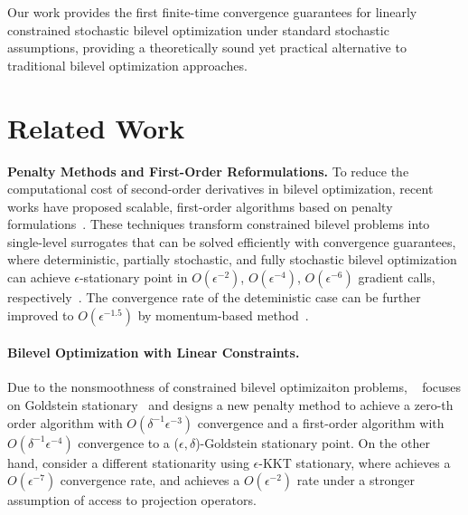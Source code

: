 \documentclass[letterpaper]{article} %
\newcommand{\1}{\mathbf{1}}
\begin{document}
Our work provides the first finite-time convergence guarantees for linearly constrained stochastic bilevel optimization under standard stochastic assumptions, providing a theoretically sound yet practical alternative to traditional bilevel optimization approaches.

\section{Related Work}

\textbf{Penalty Methods and First-Order Reformulations.} To reduce the computational cost of second-order derivatives in bilevel optimization, recent works have proposed scalable, first-order algorithms based on penalty formulations~\cite{kwon2023,liu2022bome}. These techniques transform constrained bilevel problems into single-level surrogates that can be solved efficiently with convergence guarantees, where deterministic, partially stochastic, and fully stochastic bilevel optimization can achieve $\epsilon$-stationary point in $O(\epsilon^{-2})$, $O(\epsilon^{-4})$, $O(\epsilon^{-6})$ gradient calls, respectively~\cite{chen2024optimal}. The convergence rate of the deteministic case can be further improved to $O(\epsilon^{-1.5})$ by momentum-based method~\cite{yang2023achieving}.

\paragraph{Bilevel Optimization with Linear Constraints.}
Due to the nonsmoothness of constrained bilevel optimizaiton problems, ~\cite{kornowski2024} focuses on Goldstein stationary~\cite{goldstein1977} and designs a new penalty method to achieve a zero-th order algorithm with $O(\delta^{-1} \epsilon^{-3})$ convergence and a first-order algorithm with $O(\delta^{-1} \epsilon^{-4})$ convergence to a ($\epsilon,\delta$)-Goldstein stationary point.
On the other hand, \cite{yao2024constrained,lu2024first} consider a different stationarity using $\epsilon$-KKT stationary, where \cite{lu2024first} achieves a $O(\epsilon^{-7})$ convergence rate, and \cite{yao2024constrained} achieves a $O(\epsilon^{-2})$ rate under a stronger assumption of access to projection operators.

\end{document}
